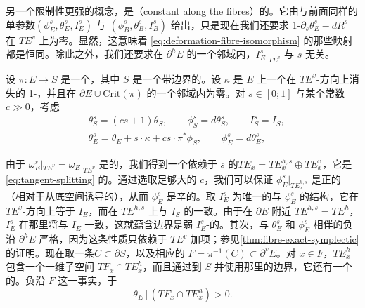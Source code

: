 另一个限制性更强的概念，是\textbf{\trConstantAlongFibres}（constant along the fibres）的\trDeformation。它由与前面同样的单参数\trFamily{}$(\phi^s_E,\theta^s_E,I^s_E)$ 与 $(\phi^s_B,\theta^s_B,I^s_B)$ 给出，只是现在我们还要求 1-\trForm{}$\partial_s\theta^s_E-dR^s$ 在 $TE^v$ 上为零。显然，这意味着 \eqref{eq:deformation-fibre-isomorphism} 的那些映射都是恒同。除此之外，我们还要求在 $\partial^h E$ 的一个邻域内，$I^s_E|_{TE^v}$ 与 $s$ 无关。

设 $\pi\colon E\to S$ 是一个\trFibrationWithSingularities，其中 $S$ 是一个带边界的\trSurface。设 $\kappa$ 是 $E$ 上一个在 $TE^v$-方向上消失的 1-\trForm，并且在 $\partial E\cup\mathrm{Crit}(\pi)$ 的一个邻域内为零。对 $s\in[0;1]$ 与某个常数 $c\gg 0$，考虑
\begin{equation}\label{eq:kappa-deformation-family}
\begin{aligned}
&\theta^s_S=(cs+1)\theta_S,\qquad \phi^s_S=d\theta^s_S,\qquad I^s_S=I_S,\\
&\theta^s_E=\theta_E+s\cdot\kappa+cs\cdot\pi^*\phi_S,\qquad \phi^s_E=d\theta^s_E,
\end{aligned}
\end{equation}

由于 $\omega^s_E|_{TE^v}=\omega_E|_{TE^v}$ 是\trNondegenerate{}的，我们得到一个依赖于 $s$ 的\trSplitting{}$TE_x=TE^{h,s}_x\oplus TE^v_x$，它是 \eqref{eq:tangent-splitting} 的\trDeformation。通过选取足够大的 $c$，我们可以保证 $\phi^s_E|_{TE^{h,s}_x}$ 是正的（相对于从底空间诱导的\trOrientation），从而 $\phi^s_E$ 是辛的。取 $I^s_E$ 为唯一的与 $\phi^s_E$ \trCompatible{}的\trAlmostComplex{}结构，它在 $TE^v$-方向上等于 $I_E$，而在 $TE^{h,s}$ 上与 $I_S$ 的\trPullback{}一致。由于在 $\partial E$ 附近 $TE^{h,s}=TE^h$，$I^s_E$ 在那里将与 $I_E$ 一致，这就蕴含边界是弱 $I^s_E$-\trConvex{}的。其次，与 $\theta^s_E$ 和 $\phi^s_E$ 相伴的负\trLiouville\trVectorField{}沿 $\partial^h E$ 严格\trIncoming，因为这条性质只依赖于 $TE^v$ 加项；参见\cref{thm:fibre-exact-symplectic}的证明。现在取一条\trBoundaryCircle{}$C\subset\partial S$，以及相应的 $F=\pi^{-1}(C)\subset\partial^v E$。对 $x\in F$，$TE^h_x$ 包含一个一维子空间 $TF_x\cap TE^h_x$，而且通过\trProjection{}到 $S$ 并使用那里的边界\trOrientation，它还有一个\trCanonical{}的\trOrientation。负\trLiouville\trVectorField{}沿 $F$ \trIncoming{}这一事实，\trEquivalence{}于
\begin{equation}\label{eq:liouville-inwards-criterion}
\theta_E\,|\,(TF_x\cap TE^h_x)>0.
\end{equation}

